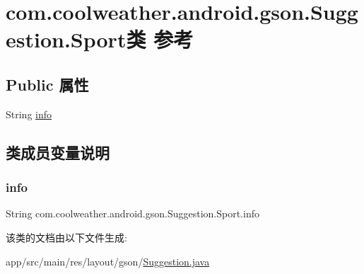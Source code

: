 \hypertarget{classcom_1_1coolweather_1_1android_1_1gson_1_1_suggestion_1_1_sport}{}\section{com.\+coolweather.\+android.\+gson.\+Suggestion.\+Sport类 参考}
\label{classcom_1_1coolweather_1_1android_1_1gson_1_1_suggestion_1_1_sport}
\subsection*{Public 属性}
\begin{DoxyCompactItemize}
\item 
String \mbox{\hyperlink{classcom_1_1coolweather_1_1android_1_1gson_1_1_suggestion_1_1_sport_aa37a68a7b79301f41f9f6abe1622214a}{info}}
\end{DoxyCompactItemize}


\subsection{类成员变量说明}
\mbox{\label{classcom_1_1coolweather_1_1android_1_1gson_1_1_suggestion_1_1_sport_aa37a68a7b79301f41f9f6abe1622214a}} 
\subsubsection{\texorpdfstring{info}{info}}
{\footnotesize\ttfamily String com.\+coolweather.\+android.\+gson.\+Suggestion.\+Sport.\+info}



该类的文档由以下文件生成\+:\begin{DoxyCompactItemize}
\item 
app/src/main/res/layout/gson/\mbox{\hyperlink{res_2layout_2gson_2_suggestion_8java}{Suggestion.\+java}}\end{DoxyCompactItemize}
